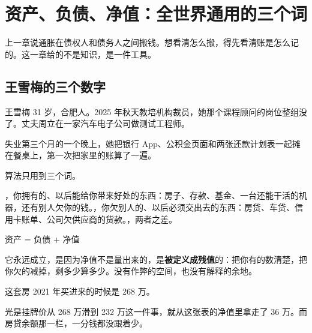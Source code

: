 \chapter{资产、负债、净值：全世界通用的三个词}

\begin{ledetext}
上一章说通胀在债权人和债务人之间搬钱。想看清怎么搬，得先看清账是怎么记的。这一章给的不是知识，是一件工具。
\end{ledetext}

\section{王雪梅的三个数字}

王雪梅 31 岁，合肥人。2025 年秋天教培机构裁员，她那个课程顾问的岗位整组没了。丈夫周立在一家汽车电子公司做测试工程师。

失业第三个月的一个晚上，她把银行 App、公积金页面和两张还款计划表一起摊在餐桌上，第一次把家里的账算了一遍。

算法只用到三个词。

，你拥有的、以后能给你带来好处的东西：房子、存款、基金、一台还能干活的机器，还有别人欠你的钱。，你欠别人的、以后必须交出去的东西：房贷、车贷、信用卡账单、公司欠供应商的货款。，两者之差。

\begin{pullquote}{}
资产 = 负债 + 净值
\end{pullquote}

它永远成立，是因为净值不是量出来的，是\textbf{被定义成残值}的：把你有的数清楚，把你欠的减掉，剩多少算多少。没有作弊的空间，也没有解释的余地。

\begin{bsheet}
\end{bsheet}

这套房 2021 年买进来的时候是 268 万。

光是挂牌价从 268 万滑到 232 万这一件事，就从这张表的净值里拿走了 36 万。而房贷余额那一栏，一分钱都没跟着少。

